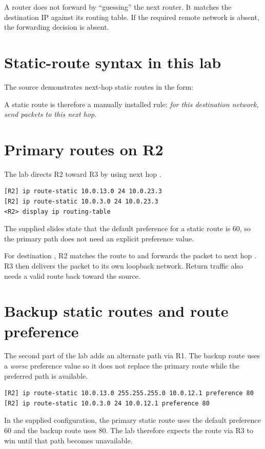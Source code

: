
\begin{keyidea}
A router does not forward by ``guessing'' the next router. It matches the destination IP against its routing table. If the required remote network is absent, the forwarding decision is absent.
\end{keyidea}

\section{Static-route syntax in this lab}
The source demonstrates next-hop static routes in the form:
\begin{center}
\end{center}
A static route is therefore a manually installed rule: \emph{for this destination network, send packets to this next hop}.

\section{Primary routes on R2}
The lab directs R2 toward R3 by using next hop .
\begin{lstlisting}[style=dcnterminal]
[R2] ip route-static 10.0.13.0 24 10.0.23.3
[R2] ip route-static 10.0.3.0 24 10.0.23.3
<R2> display ip routing-table
\end{lstlisting}
The supplied slides state that the default preference for a static route is 60, so the primary path does not need an explicit preference value.

\begin{workedexample}
For destination , R2 matches the route to  and forwards the packet to next hop . R3 then delivers the packet to its own loopback network. Return traffic also needs a valid route back toward the source.
\end{workedexample}

\section{Backup static routes and route preference}
The second part of the lab adds an alternate path via R1. The backup route uses a \emph{worse} preference value so it does not replace the primary route while the preferred path is available.
\begin{lstlisting}[style=dcnterminal]
[R2] ip route-static 10.0.13.0 255.255.255.0 10.0.12.1 preference 80
[R2] ip route-static 10.0.3.0 24 10.0.12.1 preference 80
\end{lstlisting}
In the supplied configuration, the primary static route uses the default preference 60 and the backup route uses 80. The lab therefore expects the route via R3 to win until that path becomes unavailable.

